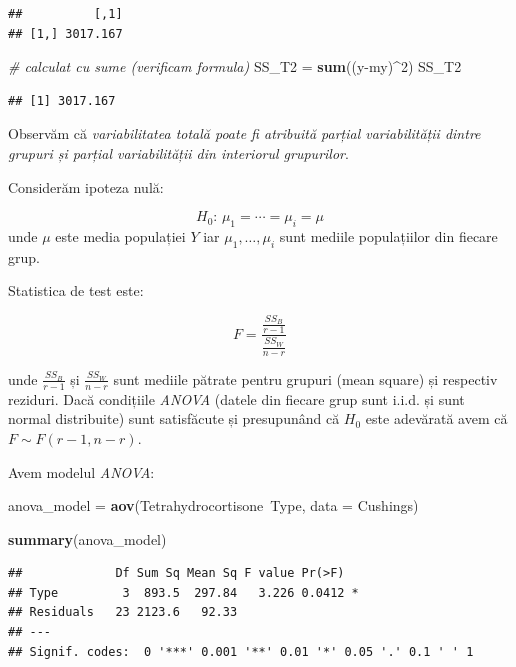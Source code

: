 \documentclass[]{article}
\newenvironment{Shaded}{\begin{snugshade}}{\end{snugshade}}
\newcommand{\KeywordTok}[1]{\textcolor[rgb]{0.13,0.29,0.53}{\textbf{{#1}}}}
\newcommand{\DataTypeTok}[1]{\textcolor[rgb]{0.13,0.29,0.53}{{#1}}}
\newcommand{\DecValTok}[1]{\textcolor[rgb]{0.00,0.00,0.81}{{#1}}}
\newcommand{\StringTok}[1]{\textcolor[rgb]{0.31,0.60,0.02}{{#1}}}
\newcommand{\CommentTok}[1]{\textcolor[rgb]{0.56,0.35,0.01}{\textit{{#1}}}}
\newcommand{\NormalTok}[1]{{#1}}
\begin{document}
\begin{verbatim}
##          [,1]
## [1,] 3017.167
\end{verbatim}

\begin{Shaded}
\begin{Highlighting}[]
\CommentTok{# calculat cu sume (verificam formula)}
\NormalTok{SS_T2 =}\StringTok{ }\KeywordTok{sum}\NormalTok{((y-my)^}\DecValTok{2}\NormalTok{)}
\NormalTok{SS_T2}
\end{Highlighting}
\end{Shaded}

\begin{verbatim}
## [1] 3017.167
\end{verbatim}

Observăm că \emph{variabilitatea totală poate fi atribuită parțial
variabilității dintre grupuri și parțial variabilității din interiorul
grupurilor}.

Considerăm ipoteza nulă:

\[
  H_0:\, \mu_1=\cdots=\mu_i=\mu
\] unde \(\mu\) este media populației \(Y\) iar \(\mu_1, \dots, \mu_i\)
sunt mediile populațiilor din fiecare grup.

Statistica de test este:

\[
  F = \frac{\frac{SS_B}{r-1}}{\frac{SS_W}{n-r}}
\]

unde \(\frac{SS_B}{r-1}\) și \(\frac{SS_W}{n-r}\) sunt mediile pătrate
pentru grupuri (mean square) și respectiv reziduri. Dacă condițiile
\emph{ANOVA} (datele din fiecare grup sunt i.i.d. și sunt normal
distribuite) sunt satisfăcute și presupunând că \(H_0\) este adevărată
avem că \(F\sim F(r-1, n-r)\).

Avem modelul \emph{ANOVA}:

\begin{Shaded}
\begin{Highlighting}[]
\NormalTok{anova_model =}\StringTok{ }\KeywordTok{aov}\NormalTok{(Tetrahydrocortisone~Type, }\DataTypeTok{data =} \NormalTok{Cushings)}

\KeywordTok{summary}\NormalTok{(anova_model)}
\end{Highlighting}
\end{Shaded}

\begin{verbatim}
##             Df Sum Sq Mean Sq F value Pr(>F)  
## Type         3  893.5  297.84   3.226 0.0412 *
## Residuals   23 2123.6   92.33                 
## ---
## Signif. codes:  0 '***' 0.001 '**' 0.01 '*' 0.05 '.' 0.1 ' ' 1
\end{verbatim}
\end{document}
